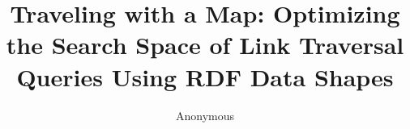 \documentclass[runningheads]{llncs}
\newif\ifanonymous
\begin{document}
\anonymoustrue

%
\title{Traveling with a Map: Optimizing the Search Space of Link Traversal Queries Using RDF Data Shapes}
%
%
\ifanonymous
    \author{Anonymous}
\else
    \author{Bryan-Elliott Tam\inst{1}\orcidID{0000-0003-3467-9755} \and
    Ruben Taelman\inst{1}\orcidID{0000-0001-5118-256X} \and
    Pieter Colpaert\inst{1}\orcidID{0000-0001-6917-2167}}
    \authorrunning{B.-E. Tam et al.}
    \institute{Universiteit Gent, Ghent, Belgium \\
    \email{\{firstname.lastname\}@ugent.be}}
\fi


%
\maketitle              %
%












\printbibliography
{}
\end{document}
